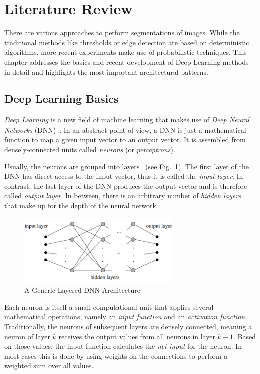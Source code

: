 \section{Literature Review}
There are various approaches to perform segmentations of images. While the traditional methods like thresholds or edge detection are based on deterministic algorithms, more recent experiments make use of probabilistic techniques. This chapter addresses the basics and recent development of Deep Learning methods in detail and highlights the most important architectural patterns.

\subsection{Deep Learning Basics}
\emph{Deep Learning} is a new field of machine learning that makes use of \emph{Deep Neural Networks} (DNN)~\cite[pp.~125f]{nn_intro96}. In an abstract point of view, a DNN is just a mathematical function to map a given input vector to an output vector. It is assembled from densely-connected units called \emph{neurons} (or \emph{perceptrons}).

Usually, the neurons are grouped into layers~\cite[p.~125]{nn_intro96} (see Fig.~\ref{fig:layered_architecture}). The first layer of the DNN has direct access to the input vector, thus it is called the \emph{input layer}. In contrast, the last layer of the DNN produces the output vector and is therefore called \emph{output layer}. In between, there is an arbitrary number of \emph{hidden layers} that make up for the depth of the neural network.

\begin{figure}[h]
    \centering
    \includegraphics[width=0.7\textwidth]{images/generic_layered_architecture}
    \caption[A Generic Layered DNN Architecture]{A Generic Layered DNN Architecture~\cite[p.~126]{nn_intro96}}
    \label{fig:layered_architecture}
\end{figure}

Each neuron is itself a small computational unit that applies several mathematical operations, namely an \emph{input function} and an \emph{activation function}. Traditionally, the neurons of subsequent layers are densely connected, meaning a neuron of layer $k$ receives the output values from all neurons in layer $k-1$. Based on those values, the input function calculates the \emph{net input} for the neuron. In most cases this is done by using weights on the connections to perform a weighted sum over all values.

